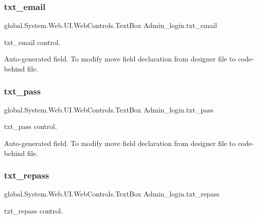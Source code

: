 \mbox{\label{class_admin__login_a8c5540adbd310df6b51614b251e3e09a}} 
\subsubsection{\texorpdfstring{txt\_email}{txt\_email}}
{\footnotesize\ttfamily global.\+System.\+Web.\+U\+I.\+Web\+Controls.\+Text\+Box Admin\+\_\+login.\+txt\+\_\+email\hspace{0.3cm}{\ttfamily [protected]}}



txt\+\_\+email control. 

Auto-\/generated field. To modify move field declaration from designer file to code-\/behind file. \mbox{\label{class_admin__login_a373c449844031a6675ec4543b12673e8}} 
\subsubsection{\texorpdfstring{txt\_pass}{txt\_pass}}
{\footnotesize\ttfamily global.\+System.\+Web.\+U\+I.\+Web\+Controls.\+Text\+Box Admin\+\_\+login.\+txt\+\_\+pass\hspace{0.3cm}{\ttfamily [protected]}}



txt\+\_\+pass control. 

Auto-\/generated field. To modify move field declaration from designer file to code-\/behind file. \mbox{\label{class_admin__login_a39649da655a43a91592bb818f05ead62}} 
\subsubsection{\texorpdfstring{txt\_repass}{txt\_repass}}
{\footnotesize\ttfamily global.\+System.\+Web.\+U\+I.\+Web\+Controls.\+Text\+Box Admin\+\_\+login.\+txt\+\_\+repass\hspace{0.3cm}{\ttfamily [protected]}}



txt\+\_\+repass control. 

